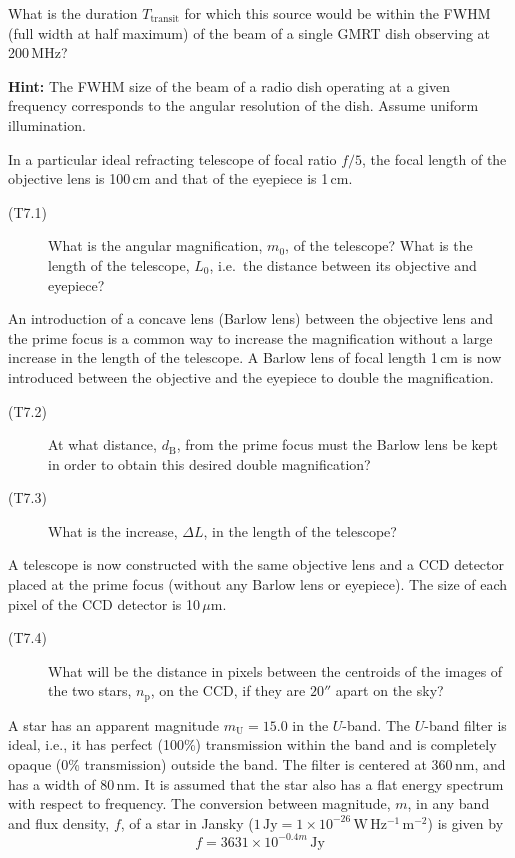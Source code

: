 What is the duration $T_{\mathrm{transit}}$ for which this source would be
within the FWHM (full width at half maximum) of the beam of a single GMRT dish
observing at 200\,MHz?

\textbf{Hint:} The FWHM size of the beam of a radio dish operating at a given
frequency corresponds to the angular resolution of the dish. Assume uniform
illumination.

In a particular ideal refracting telescope of focal ratio $f/5$, the focal
length of the objective lens is 100\,cm and that of the eyepiece is 1\,cm.

\begin{description}
\item[(T7.1)] What is the angular magnification, $m_0$, of the telescope? What
  is the length of the telescope, $L_0$, i.e.\ the distance between its
  objective and eyepiece?
\end{description}

An introduction of a concave lens (Barlow lens) between the objective lens and
the prime focus is a common way to increase the magnification without a large
increase in the length of the telescope. A Barlow lens of focal length 1\,cm is
now introduced between the objective and the eyepiece to double the
magnification.

\begin{description}
\item[(T7.2)] At what distance, $d_{\mathrm{B}}$, from the prime focus must the
  Barlow lens be kept in order to obtain this desired double magnification?
\item[(T7.3)] What is the increase, $\Delta L$, in the length of the telescope?
\end{description}

A telescope is now constructed with the same objective lens and a CCD detector
placed at the prime focus (without any Barlow lens or eyepiece). The size of
each pixel of the CCD detector is 10\,$\mu$m.

\begin{description}
\item[(T7.4)] What will be the distance in pixels between the centroids of the
  images of the two stars, $n_{\mathrm{p}}$, on the CCD, if they are $20''$
  apart on the sky?
\end{description}

A star has an apparent magnitude $m_{\mathrm{U}} = 15.0$ in the $U$-band. The
$U$-band filter is ideal, i.e., it has perfect (100\%) transmission within the
band and is completely opaque (0\% transmission) outside the band. The filter
is centered at 360\,nm, and has a width of 80\,nm. It is assumed that the star
also has a flat energy spectrum with respect to frequency. The conversion
between magnitude, $m$, in any band and flux density, $f$, of a star in Jansky
($1\,\mathrm{Jy} = 1 \times 10^{-26}\,\mathrm{W\,Hz^{-1}\,m^{-2}}$) is given by
\[ f = 3631 \times 10^{-0.4 m}\,\mathrm{Jy} \]

